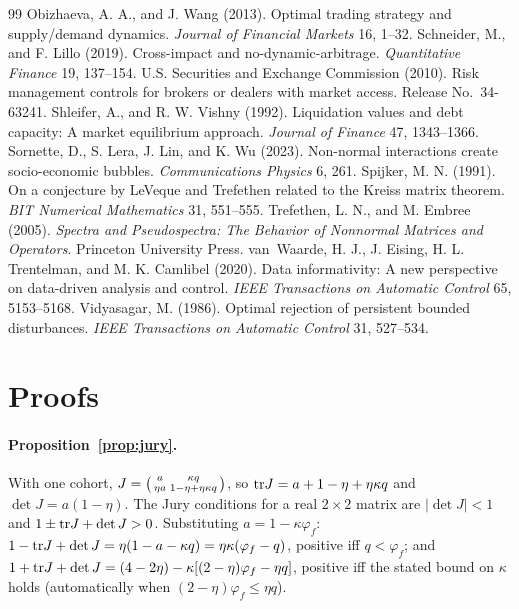 \begin{thebibliography}{99}
 Obizhaeva, A. A., and J. Wang (2013). Optimal trading strategy and supply/demand dynamics. \emph{Journal of Financial Markets} 16, 1--32.
 Schneider, M., and F. Lillo (2019). Cross-impact and no-dynamic-arbitrage. \emph{Quantitative Finance} 19, 137--154.
 U.S. Securities and Exchange Commission (2010). Risk management controls for brokers or dealers with market access. Release No.\ 34-63241.
 Shleifer, A., and R. W. Vishny (1992). Liquidation values and debt capacity: A market equilibrium approach. \emph{Journal of Finance} 47, 1343--1366.
 Sornette, D., S. Lera, J. Lin, and K. Wu (2023). Non-normal interactions create socio-economic bubbles. \emph{Communications Physics} 6, 261.
 Spijker, M. N. (1991). On a conjecture by LeVeque and Trefethen related to the Kreiss matrix theorem. \emph{BIT Numerical Mathematics} 31, 551--555.
 Trefethen, L. N., and M. Embree (2005). \emph{Spectra and Pseudospectra: The Behavior of Nonnormal Matrices and Operators}. Princeton University Press.
 van~Waarde, H. J., J. Eising, H. L. Trentelman, and M. K. Camlibel (2020). Data informativity: A new perspective on data-driven analysis and control. \emph{IEEE Transactions on Automatic Control} 65, 5153--5168.
 Vidyasagar, M. (1986). Optimal rejection of persistent bounded disturbances. \emph{IEEE Transactions on Automatic Control} 31, 527--534.
\end{thebibliography}

\appendix
\section{Proofs}\label{app:proofs}

\paragraph{Proposition~\ref{prop:jury}.} With one cohort, $J=\begin{psmallmatrix}a&\kappa q\\ \eta a&1-\eta+\eta\kappa q\end{psmallmatrix}$, so ${\rm tr}J=a+1-\eta+\eta\kappa q$ and $\det J=a(1-\eta)$. The Jury conditions for a real $2\times2$ matrix are $|\det J|<1$ and $1\pm{\rm tr}J+\det J>0$. Substituting $a=1-\kappa\varphi_f$: $1-{\rm tr}J+\det J=\eta(1-a-\kappa q)=\eta\kappa(\varphi_f-q)$, positive iff $q<\varphi_f$; and $1+{\rm tr}J+\det J=(4-2\eta)-\kappa[(2-\eta)\varphi_f-\eta q]$, positive iff the stated bound on $\kappa$ holds (automatically when $(2-\eta)\varphi_f\le\eta q$).

